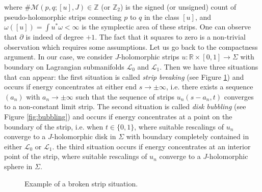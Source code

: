 \documentclass[11pt,colorinlistoftodos]{amsart}
\numberwithin{equation}{subsection}
\theoremstyle{plain}
\theoremstyle{definition}
\theoremstyle{remark}
\newcommand{\R}{\mathbb{R}}
\newcommand{\Z}{\mathbb{Z}}
\newcommand{\de}{\partial}
\newcommand{\calL}{\mathcal{L}}
\newcommand{\calM}{\mathcal{M}}
\begin{document}
where $\#\calM(p,q;[u],J)\in\Z$ (or $\Z_2$) is the signed (or unsigned) count of pseudo-holomorphic strips connecting $p$ to $q$ in the class $[u]$, and $\omega([u])=\int u^*\omega<\infty$ is the symplectic area of these strips. One can observe that $\de$ is indeed of degree $+1$. The fact that it squares to zero is a non-trivial observation which requires some assumptions. Let us go back to the compactness argument. In our case, we consider $J$-holomorphic strips $u\colon\R\times[0,1]\to \Sigma$ with boundary on Lagrangian submanifolds $\calL_0$ and $\calL_1$. Then we have three situations that can appear: the first situation is called \emph{strip breaking} (see Figure \ref{fig:broken_strip}) and occurs if energy concentrates at either end $s\to \pm\infty$, i.e. there exists a sequence $(a_n)$ with $a_n\to \pm\infty$ such that the sequence of strips $u_n(s-a_n,t)$ converges to a non-constant limit strip. The second situation is called \emph{disk bubbling} (see Figure \ref{fig:bubbling}) and occurs if energy concentrates at a point on the boundary of the strip, i.e. when $t\in\{0,1\}$, where suitable rescalings of $u_n$ converge to a $J$-holomorphic disk in $\Sigma$ with boundary completely contained in either $\calL_0$ or $\calL_1$. the third situation occurs if energy concentrates at an interior point of the strip, where suitable rescalings of $u_n$ converge to a $J$-holomorphic sphere in $\Sigma$. 

\begin{figure}[h!]
    \centering
    \caption{Example of a broken strip situation.}
    \label{fig:broken_strip}
\end{figure}
\end{document}
